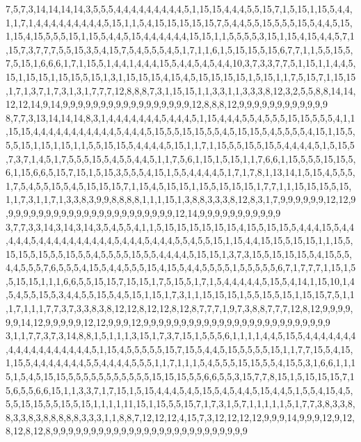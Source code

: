 7,5,7,3,14,14,14,14,3,5,5,5,4,4,4,4,4,4,4,4,4,5,1,15,15,4,4,4,5,5,15,7,1,5,15,1,15,5,4,4,1,1,7,1,4,4,4,4,4,4,4,4,4,5,15,1,1,5,4,15,15,15,15,15,7,5,4,4,5,5,15,5,5,5,15,5,4,4,5,15,1,15,4,15,5,5,5,15,1,15,5,4,4,5,15,4,4,4,4,4,4,15,15,1,1,5,5,5,5,3,15,1,15,4,15,4,4,5,7,1,15,7,3,7,7,7,5,5,15,3,5,4,15,7,5,4,5,5,5,4,5,1,7,1,1,6,1,5,15,15,5,15,6,7,7,1,1,5,5,15,5,7,5,15,1,6,6,6,1,7,1,15,5,1,4,4,1,4,4,4,15,5,4,4,5,4,5,4,4,10,3,7,3,3,7,7,5,1,15,1,1,4,4,5,15,1,15,15,1,15,15,5,15,1,3,1,15,15,15,4,15,4,5,15,15,15,15,1,5,15,1,1,7,5,15,7,1,15,15,1,7,1,3,7,1,7,3,1,3,1,7,7,7,12,8,8,8,7,3,1,15,15,1,1,3,3,1,1,3,3,3,8,12,3,2,5,5,8,8,14,14,12,12,14,9,14,9,9,9,9,9,9,9,9,9,9,9,9,9,9,9,9,9,12,8,8,8,12,9,9,9,9,9,9,9,9,9,9,9,9
8,7,7,3,13,14,14,14,8,3,1,4,4,4,4,4,4,4,5,4,4,4,5,1,15,4,4,4,5,5,4,5,5,5,15,15,5,5,5,4,1,1,15,15,4,4,4,4,4,4,4,4,4,4,4,5,4,4,4,5,15,5,5,15,15,5,5,4,5,15,15,5,4,5,5,5,5,4,15,1,15,5,5,5,15,1,15,1,15,1,1,5,5,15,15,5,4,4,4,4,5,15,1,1,7,1,15,5,5,15,5,15,5,4,4,4,4,5,1,5,15,5,7,3,7,1,4,5,1,7,5,5,5,15,5,4,5,5,4,4,5,1,1,7,5,6,1,15,1,5,15,1,1,7,6,6,1,15,5,5,5,15,15,5,6,1,15,6,6,5,15,7,15,1,5,15,3,5,5,5,4,15,1,5,5,4,4,4,4,5,1,7,1,7,8,1,13,14,1,5,15,4,5,5,5,1,7,5,4,5,5,15,5,4,5,15,15,15,7,1,15,4,5,15,15,1,15,5,15,15,15,1,7,7,1,1,15,15,15,5,15,1,1,7,3,1,1,7,1,3,3,8,3,9,9,8,8,8,8,1,1,1,15,1,3,8,8,3,3,3,8,12,8,3,1,7,9,9,9,9,9,9,12,12,9,9,9,9,9,9,9,9,9,9,9,9,9,9,9,9,9,9,9,9,9,9,9,12,14,9,9,9,9,9,9,9,9,9,9,9
3,7,7,3,3,14,3,14,3,14,3,5,4,5,5,4,1,1,5,15,15,15,15,15,15,4,15,5,15,15,5,4,4,4,15,5,4,4,4,4,4,5,4,4,4,4,4,4,4,4,4,4,5,4,4,4,5,4,4,4,5,5,4,5,5,15,1,15,4,4,15,15,5,15,15,1,1,15,5,15,15,5,15,5,5,15,5,5,4,5,5,5,5,15,5,5,4,4,4,4,5,15,15,1,3,7,3,15,5,15,15,15,5,4,15,5,5,4,4,5,5,5,7,6,5,5,5,4,15,5,4,4,5,5,5,15,4,15,5,4,4,5,5,5,5,1,5,5,5,5,5,6,7,1,7,7,7,1,15,1,5,5,15,15,1,1,1,6,6,5,5,15,15,7,15,15,1,7,5,15,5,1,7,1,5,4,4,4,4,4,5,15,5,4,14,1,15,10,1,4,5,4,5,5,15,5,3,4,4,5,5,15,5,4,5,15,1,15,1,7,3,1,1,15,15,15,1,5,5,15,5,15,1,15,15,7,5,1,1,1,7,1,1,1,7,7,3,7,3,3,8,3,8,12,12,8,12,12,8,12,8,7,7,7,1,9,7,3,8,8,7,7,7,12,8,12,9,9,9,9,9,9,14,12,9,9,9,9,9,12,12,9,9,9,12,9,9,9,9,9,9,9,9,9,9,9,9,9,9,9,9,9,9,9,9,9,9,9,9,9
3,1,1,7,7,3,7,3,14,8,8,1,5,1,1,1,3,15,1,7,3,7,15,1,5,5,5,6,1,1,1,1,4,4,5,15,5,4,4,4,4,4,4,4,4,4,4,4,4,4,4,4,4,4,4,5,1,15,4,5,5,5,5,5,15,7,15,5,4,4,5,15,5,5,5,5,15,1,1,7,7,15,5,4,15,1,15,5,4,4,4,4,4,4,4,5,5,4,4,4,4,5,5,5,1,1,7,1,1,1,5,4,5,5,5,15,15,5,5,4,15,5,3,1,6,6,1,1,15,1,5,4,5,15,15,5,5,5,5,5,5,5,5,5,5,5,15,15,15,5,5,6,6,5,5,3,15,7,7,8,15,1,5,15,15,15,7,15,6,5,5,6,6,15,1,1,3,3,7,1,7,15,1,5,15,4,4,4,5,4,5,15,5,4,5,4,4,5,15,4,4,5,1,5,5,4,15,4,5,5,5,15,15,5,5,15,5,15,1,1,1,1,11,15,1,15,5,5,15,7,1,7,3,1,5,7,1,1,1,1,1,5,1,7,7,3,8,3,3,8,8,3,3,8,3,8,8,8,8,8,3,3,3,1,1,8,8,7,12,12,12,4,15,7,3,12,12,12,12,9,9,9,14,9,9,9,12,9,12,8,12,8,12,8,9,9,9,9,9,9,9,9,9,9,9,9,9,9,9,9,9,9,9,9,9,9,9,9,9,9
